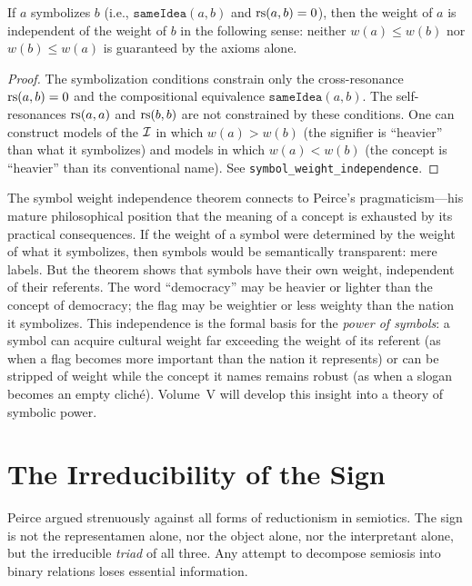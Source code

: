 \begin{theorem}
\label{thm:symbol-weight-indep}
If $a$ symbolizes $b$ (i.e., $\texttt{sameIdea}(a, b)$ and $\mathrm{rs}(a, b) = 0$), then the weight of $a$ is independent of the weight of $b$ in the following sense: neither $w(a) \leq w(b)$ nor $w(b) \leq w(a)$ is guaranteed by the axioms alone.
\end{theorem}

\begin{proof}
The symbolization conditions constrain only the cross-resonance $\mathrm{rs}(a, b) = 0$ and the compositional equivalence $\texttt{sameIdea}(a, b)$. The self-resonances $\mathrm{rs}(a, a)$ and $\mathrm{rs}(b, b)$ are not constrained by these conditions. One can construct models of the $\mathcal{I}$ in which $w(a) > w(b)$ (the signifier is ``heavier'' than what it symbolizes) and models in which $w(a) < w(b)$ (the concept is ``heavier'' than its conventional name). See \texttt{symbol\_weight\_independence}.
\end{proof}

\begin{remark}
The symbol weight independence theorem connects to Peirce's pragmaticism---his mature philosophical position that the meaning of a concept is exhausted by its practical consequences. If the weight of a symbol were determined by the weight of what it symbolizes, then symbols would be semantically transparent: mere labels. But the theorem shows that symbols have their own weight, independent of their referents. The word ``democracy'' may be heavier or lighter than the concept of democracy; the flag may be weightier or less weighty than the nation it symbolizes. This independence is the formal basis for the \emph{power of symbols}: a symbol can acquire cultural weight far exceeding the weight of its referent (as when a flag becomes more important than the nation it represents) or can be stripped of weight while the concept it names remains robust (as when a slogan becomes an empty clich\'e). Volume~V will develop this insight into a theory of symbolic power.
\end{remark}

\section{The Irreducibility of the Sign}

Peirce argued strenuously against all forms of reductionism in
semiotics. The sign is not the representamen alone, nor the object
alone, nor the interpretant alone, but the irreducible \emph{triad}
of all three. Any attempt to decompose semiosis into binary relations
loses essential information.

